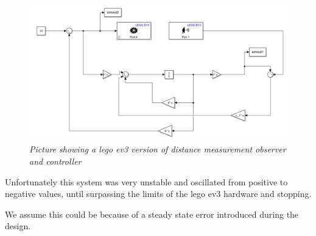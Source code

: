 \documentclass[a4paper,onecolumn,amsmath,amssymb]{revtex4-1}
\begin{document}
\begin{figure}
	\includegraphics[width=\textwidth, trim= 0cm 0cm 0cm 0cm, clip]{project_working.png}
	\caption{\textit{Picture showing a lego ev3 version of distance measurement observer and controller }\label{fig:projectworking}}
\end{figure}


Unfortunately this system was very unstable and oscillated from positive to negative values, until surpassing the limits of the lego ev3 hardware and stopping.

We assume this could be because of a steady state error introduced during the design. 
\end{document}
